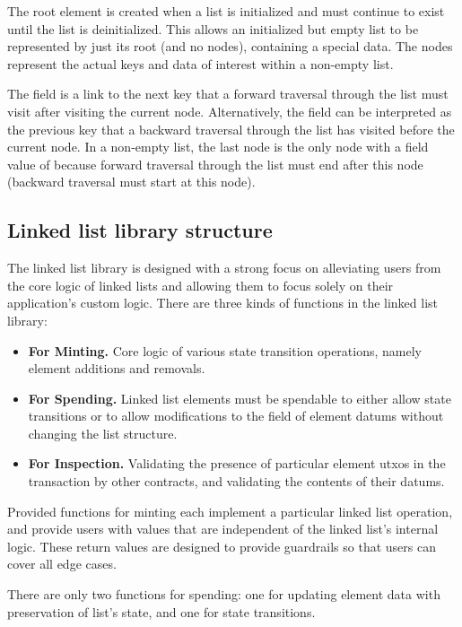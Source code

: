 \documentclass[../midgard.tex]{subfiles}
\begin{document}
The root element is created when a list is initialized and must continue to exist until the list is deinitialized.
This allows an initialized but empty list to be represented by just its root (and no nodes), containing a special data.
The nodes represent the actual keys and data of interest within a non-empty list.

The  field is a link to the next key that a forward traversal through the list must visit after visiting the current node.
Alternatively, the  field can be interpreted as the previous key that a backward traversal through the list has visited before the current node.
In a non-empty list, the last node is the only node with a  field value of  because forward traversal through the list must end after this node (backward traversal must start at this node).

\subsection{Linked list library structure}
\label{h:list-library-structure}

The linked list library is designed with a strong focus on alleviating users from the core logic of linked lists and allowing them to focus solely on their application's custom logic.
There are three kinds of functions in the linked list library:
\begin{itemize}
  \item \textbf{For Minting.} Core logic of various state transition operations, namely element additions and removals.
  \item \textbf{For Spending.} Linked list elements must be spendable to either allow state transitions or to allow modifications to the  field of element datums without changing the list structure.
  \item \textbf{For Inspection.} Validating the presence of particular element utxos in the transaction by other contracts, and validating the contents of their datums.
\end{itemize}

Provided functions for minting each implement a particular linked list operation, and provide users with values that are independent of the linked list's internal logic.
These return values are designed to provide guardrails so that users can cover all edge cases.

There are only two functions for spending: one for updating element data with preservation of list's state, and one for state transitions.
\end{document}
